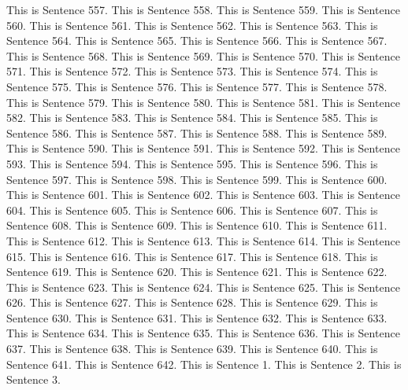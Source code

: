 \documentclass{article}
\begin{document}
This is Sentence 557.
This is Sentence 558.
This is Sentence 559.
This is Sentence 560.
This is Sentence 561.
This is Sentence 562.
This is Sentence 563.
This is Sentence 564.
This is Sentence 565.
This is Sentence 566.
This is Sentence 567.
This is Sentence 568.
This is Sentence 569.
This is Sentence 570.
This is Sentence 571.
This is Sentence 572.
This is Sentence 573.
This is Sentence 574.
This is Sentence 575.
This is Sentence 576.
This is Sentence 577.
This is Sentence 578.
This is Sentence 579.
This is Sentence 580.
This is Sentence 581.
This is Sentence 582.
This is Sentence 583.
This is Sentence 584.
This is Sentence 585.
This is Sentence 586.
This is Sentence 587.
This is Sentence 588.
This is Sentence 589.
This is Sentence 590.
This is Sentence 591.
This is Sentence 592.
This is Sentence 593.
This is Sentence 594.
This is Sentence 595.
This is Sentence 596.
This is Sentence 597.
This is Sentence 598.
This is Sentence 599.
This is Sentence 600.
This is Sentence 601.
This is Sentence 602.
This is Sentence 603.
This is Sentence 604.
This is Sentence 605.
This is Sentence 606.
This is Sentence 607.
This is Sentence 608.
This is Sentence 609.
This is Sentence 610.
This is Sentence 611.
This is Sentence 612.
This is Sentence 613.
This is Sentence 614.
This is Sentence 615.
This is Sentence 616.
This is Sentence 617.
This is Sentence 618.
This is Sentence 619.
This is Sentence 620.
This is Sentence 621.
This is Sentence 622.
This is Sentence 623.
This is Sentence 624.
This is Sentence 625.
This is Sentence 626.
This is Sentence 627.
This is Sentence 628.
This is Sentence 629.
This is Sentence 630.
This is Sentence 631.
This is Sentence 632.
This is Sentence 633.
This is Sentence 634.
This is Sentence 635.
This is Sentence 636.
This is Sentence 637.
This is Sentence 638.
This is Sentence 639.
This is Sentence 640.
This is Sentence 641.
This is Sentence 642.
This is Sentence 1.
This is Sentence 2.
This is Sentence 3.
\end{document}
